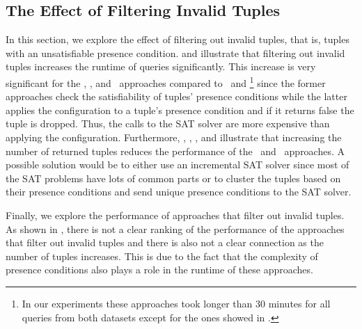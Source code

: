 \subsection{The Effect of Filtering Invalid Tuples}
\label{sec:exp-tuples}

In this section, we explore the effect of filtering out invalid tuples, that is, tuples with
an unsatisfiable presence condition.  and 
illustrate that filtering out invalid tuples increases the runtime of queries significantly. 
%
This increase is very significant for the \ubf, \ubfi, and \uav\ approaches compared to
\nbf\ and \nbfi\footnote{In our experiments these approaches took longer than 30 minutes for 
all queries from both datasets except for the ones showed in .
}
since the former approaches check the satisfiability of tuples' 
presence conditions while the latter applies the configuration to a tuple's 
presence condition and if it returns false the tuple is dropped. Thus,
the calls to the SAT solver are more expensive than applying the configuration.
%
Furthermore, , , 
, and  illustrate that increasing the number of 
returned tuples reduces the performance of the \nbf\ and \nbfi\ approaches. 
%
A possible solution would be to either use an incremental SAT solver since most of the
SAT problems have lots of common parts or to cluster the tuples based on their presence
conditions and send unique presence conditions to the SAT solver. 

Finally, we explore the performance of approaches that filter out invalid tuples. 
As shown in , there is not a clear ranking of
the performance of the approaches that filter out invalid tuples and there is also
not a clear connection as the number of tuples increases. This is due to the fact that 
the complexity of presence conditions also plays a role in the runtime of these approaches. 

